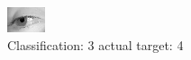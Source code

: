 \begin{figure}[h!]
\begin{center}
\includegraphics[width=0.60\columnwidth]{figures/ID2893_class_3_target_4.png}
\end{center}
\caption{ Classification: 3 actual target: 4}
\label{fig:ID2893_class_3_target_4}
\end{figure}
